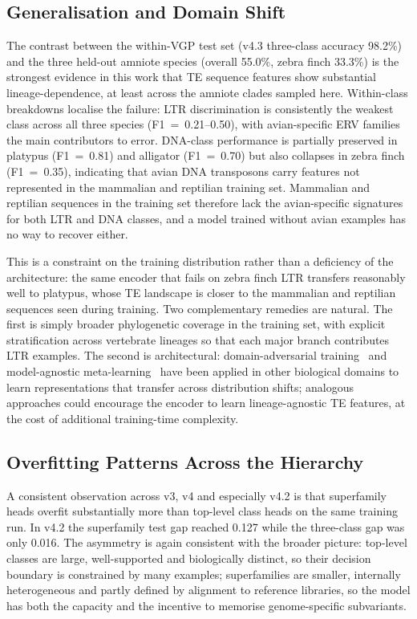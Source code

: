 \documentclass[12pt]{article}
\begin{document}
\subsection{Generalisation and Domain Shift}

The contrast between the within-VGP test set (v4.3 three-class accuracy 98.2\%) and the three held-out amniote species (overall 55.0\%, zebra finch 33.3\%) is the strongest evidence in this work that TE sequence features show substantial lineage-dependence, at least across the amniote clades sampled here. Within-class breakdowns localise the failure: LTR discrimination is consistently the weakest class across all three species (F1~=~0.21--0.50), with avian-specific ERV families the main contributors to error. DNA-class performance is partially preserved in platypus (F1~=~0.81) and alligator (F1~=~0.70) but also collapses in zebra finch (F1~=~0.35), indicating that avian DNA transposons carry features not represented in the mammalian and reptilian training set. Mammalian and reptilian sequences in the training set therefore lack the avian-specific signatures for both LTR and DNA classes, and a model trained without avian examples has no way to recover either.

This is a constraint on the training distribution rather than a deficiency of the architecture: the same encoder that fails on zebra finch LTR transfers reasonably well to platypus, whose TE landscape is closer to the mammalian and reptilian sequences seen during training. Two complementary remedies are natural. The first is simply broader phylogenetic coverage in the training set, with explicit stratification across vertebrate lineages so that each major branch contributes LTR examples. The second is architectural: domain-adversarial training~\cite{ganin2015unsupervised} and model-agnostic meta-learning~\cite{finn2017model} have been applied in other biological domains to learn representations that transfer across distribution shifts; analogous approaches could encourage the encoder to learn lineage-agnostic TE features, at the cost of additional training-time complexity.

\subsection{Overfitting Patterns Across the Hierarchy}

A consistent observation across v3, v4 and especially v4.2 is that superfamily heads overfit substantially more than top-level class heads on the same training run. In v4.2 the superfamily test gap reached 0.127 while the three-class gap was only 0.016. The asymmetry is again consistent with the broader picture: top-level classes are large, well-supported and biologically distinct, so their decision boundary is constrained by many examples; superfamilies are smaller, internally heterogeneous and partly defined by alignment to reference libraries, so the model has both the capacity and the incentive to memorise genome-specific subvariants.
\end{document}
